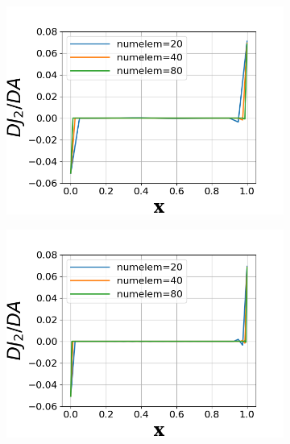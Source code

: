 \documentclass[a4paper]{article}
\begin{document}
\begin{figure}[!htbp]
  \centering
  \begin{subfigure}{0.45\textwidth}
    \centering
    \includegraphics[width=1.0\linewidth]{figures/DJ2DA_p1.png}
    \label{fig:Dj2_p1}
  \end{subfigure}
  \begin{subfigure}{0.45\textwidth}
    \centering
    \includegraphics[width=1.0\linewidth]{figures/DJ2DA_p2.png}
    \label{fig:Dj2_p2}
  \end{subfigure}
  \begin{subfigure}{0.45\textwidth}
    \centering

\end{subfigure}
\end{figure}
\end{document}
